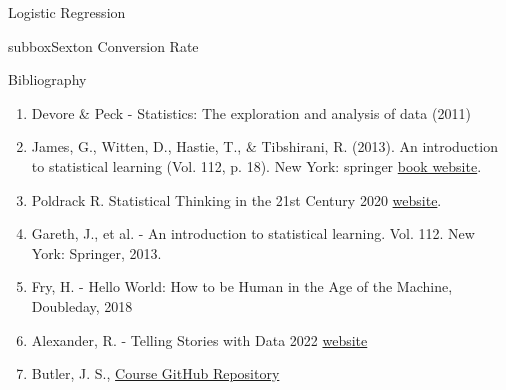 \documentclass[10pt,a4paper]{article}
\begin{document}
\begin{multicols}{3}
\begin{textbox}{Logistic Regression}
\begin{subbox}{subbox}{Sexton Conversion Rate}
\end{subbox}
\end{textbox}
\begin{textbox}{Bibliography}
\begin{enumerate}
\item 
Devore \& Peck  - Statistics: The exploration and analysis of data (2011)
\item James, G., Witten, D., Hastie, T., \& Tibshirani, R. (2013). An introduction to statistical learning (Vol. 112, p. 18). New York: springer 
\href{https://www.statlearning.com}{book website}.
\item Poldrack R. Statistical Thinking in the 21st Century 2020 \href{https://statsthinking21.github.io/statsthinking21-core-site/index.html}{website}.
\item
Gareth, J., et al. - An introduction to statistical learning. Vol. 112. New York: Springer, 2013.
\item
Fry, H. - Hello World: How to be Human in the Age of the Machine, Doubleday, 2018
\item Alexander,  R. - Telling Stories with Data 2022 \href{https://tellingstorieswithdata.com}{website}
\item Butler, J. S., \href{https://github.com/john-s-butler-dit/Probability_and_Statistical_Inference}{Course GitHub Repository}  

\end{enumerate}



\end{textbox}
\end{multicols}
\end{document}
